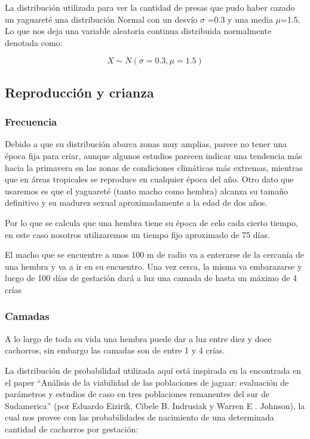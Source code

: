     La distribución utilizada para ver la cantidad de presas que pudo haber cazado un yaguareté una distribución Normal con un desvío $\sigma$ =0.3 y una media $\mu$=1.5. Lo que nos deja una variable aleatoria continua distribuida normalmente denotada como:

    \begin{equation}
        X \sim N(\sigma=0.3, \mu=1.5)
    \end{equation}
    
    \subsection{Reproducción y crianza}
    
        \subsubsection{Frecuencia}
            Debido a que su distribución abarca zonas muy amplias, parece no tener una época fija para criar, aunque algunos estudios parecen indicar una tendencia más hacia la primavera en las zonas de condiciones climáticas más extremas, mientras que en áreas tropicales se reproduce en cualquier época del año. Otro dato que usaremos es que el yaguareté (tanto macho como hembra) alcanza su tamaño definitivo y su madurez sexual aproximadamente a la edad de dos años.
            
            Por lo que se calcula que una hembra tiene su época de celo cada cierto tiempo, en este caso nosotros utilizaremos un tiempo fijo aproximado de 75 días.
            
            El macho que se encuentre a unos 100 m de radio va a enterarse de la cercanía de una hembra y va a ir en su encuentro. Una vez cerca, la misma va embarazarse y luego de 100 días de gestación dará a luz una camada de hasta un máximo de 4 crías
        
        \subsubsection{Camadas}
            A lo largo de toda su vida una hembra puede dar a luz entre diez y doce cachorros, sin embargo las camadas son de entre 1 y 4 crías.
            
            La distribución de probabilidad utilizada aquí está inspirada en la encontrada en el paper “Análisis de la viabilidad de las poblaciones de jaguar: evaluación de parámetros y estudios de caso en tres poblaciones remanentes del sur de Sudamerica” (por Eduardo Eizirik, Cibele B. Indrusiak y Warren E . Johnson), la cual nos provee con las probabilidades de nacimiento de una determinada cantidad de cachorros por gestación:

